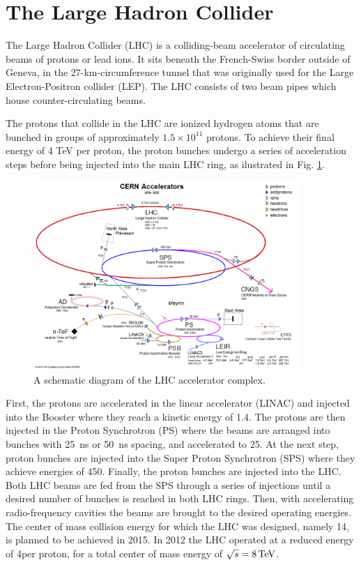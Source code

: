 \section{The Large Hadron Collider}

The Large Hadron Collider (LHC) \cite{Evans:2008zzb,Bruning:2004ej} is a colliding-beam accelerator 
of circulating beams of protons
or lead ions. 
It sits beneath the French-Swiss border outside of Geneva, in the 27-km-circumference tunnel that was originally used
for the Large Electron-Positron collider (LEP). 
 The LHC consists of two beam pipes which house counter-circulating beams.

The protons that collide in the LHC are ionized hydrogen atoms that are bunched in groups
of approximately $1.5\times10^{11}$ protons. To achieve their final energy of 4 TeV per proton,
the proton bunches undergo a series of acceleration steps before being injected into
the main LHC ring, as ilustrated in Fig. \ref{fig:accelerators}.

\begin{figure}[htbp]
\centering
\includegraphics[width=0.9\textwidth]{plots/intro/accelerators.png}
\caption{A schematic diagram of the LHC accelerator complex.\label{fig:accelerators}}
\end{figure}

First, the protons are accelerated in the linear accelerator (LINAC) and injected into 
the Booster where they reach a kinetic energy of 1.4\GeV. The protons are then injected
in the Proton Synchrotron (PS) where the beams are arranged into bunches
with 25~ns or 50~ns spacing, and accelerated to 25\GeV. At the next step,
 proton bunches are injected
into the Super Proton Synchrotron (SPS) where they achieve energies of 450\GeV. Finally, the proton
bunches are injected into the LHC. Both LHC beams are fed from the SPS through a series of injections
until a desired number of bunches is reached in both LHC rings. Then, with accelerating 
radio-frequency cavities the beams are brought to the desired operating energies.
The center of mass collision energy for which the LHC was designed, namely 14\TeV,
 is planned to be achieved in 2015.
In 2012 the LHC operated at a reduced energy of 4\TeV per proton, for a total
center of mass energy of $\sqrt{s} = 8 \,\text{Te\hspace{-.08em}V}$.


